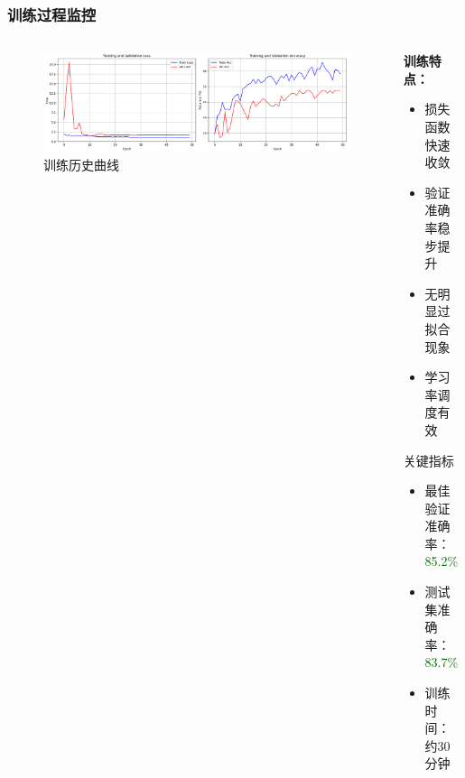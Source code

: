 \documentclass[12pt]{beamer}
\begin{document}
\begin{frame}
\frametitle{训练过程监控}
\begin{columns}
\begin{column}{0.5\textwidth}
\begin{figure}
\centering
\includegraphics[width=\textwidth]{training_history.png}
\caption{训练历史曲线}
\end{figure}
\end{column}

\begin{column}{0.5\textwidth}
\textbf{训练特点：}
\begin{itemize}
    \item 损失函数快速收敛
    \item 验证准确率稳步提升
    \item 无明显过拟合现象
    \item 学习率调度有效
\end{itemize}

\vspace{0.3cm}
\begin{block}{关键指标}
\begin{itemize}
    \item 最佳验证准确率：\textcolor{darkgreen}{85.2\%}
    \item 测试集准确率：\textcolor{darkgreen}{83.7\%}
    \item 训练时间：约30分钟
\end{itemize}
\end{block}
\end{column}
\end{columns}
\end{frame}
\end{document}
